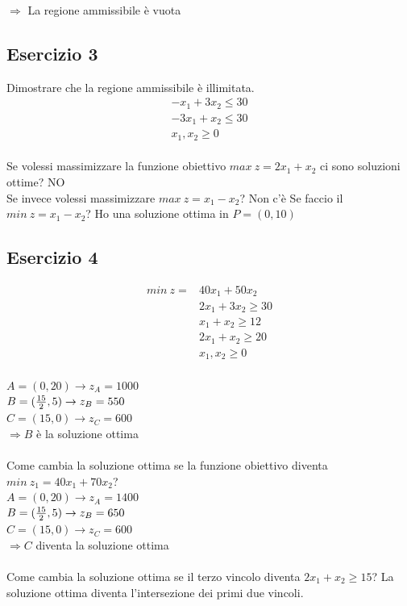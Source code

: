 \documentclass[12pt,a4paper]{article}
\begin{document}
 $\Longrightarrow$ La regione ammissibile è vuota
 
\subsection{Esercizio 3}
Dimostrare che la regione ammissibile è illimitata.
$$\begin{array}{c}
-x_1+3x_2 \leq 30\\
-3x_1+x_2 \leq 30\\
x_1,x_2 \geq 0
 \end{array}$$\\
 Se volessi massimizzare la funzione obiettivo $max\ z = 2x_1+x_2$ ci sono soluzioni ottime? NO\\
 Se invece volessi massimizzare $max \ z = x_1-x_2$? Non c'è
 Se faccio il $min\ z =  x_1-x_2$? Ho una soluzione ottima in $P=(0,10)$
 
\subsection{Esercizio 4}
$$\begin{array}{cl}
min \ z = & 40x_1+50x_2\\
 & 2x_1+3x_2 \geq 30\\
 & x_1+x_2 \geq 12\\
 & 2x_1+x_2 \geq 20\\
 & x_1,x_2 \geq 0
 \end{array}$$\\
 $A=(0,20) \rightarrow z_A = 1000$\\
 $B=({15 \over 2}, 5) \rightarrow z_B = 550$\\
 $C=(15,0) \rightarrow z_C = 600$\\
 
 $\Longrightarrow B$ è la soluzione ottima\\
 \\
 Come cambia la soluzione ottima se la funzione obiettivo diventa $min\ z_1=40x_1+70x_2$?\\
 $A=(0,20) \rightarrow z_A = 1400$\\
 $B=({15 \over 2}, 5) \rightarrow z_B = 650$\\
 $C=(15,0) \rightarrow z_C = 600$\\
 
$\Longrightarrow C$ diventa la soluzione ottima\\
\\
Come cambia la soluzione ottima se il terzo vincolo diventa $2x_1+x_2\geq 15$? La soluzione ottima diventa l'intersezione dei primi due vincoli.
\end{document}
